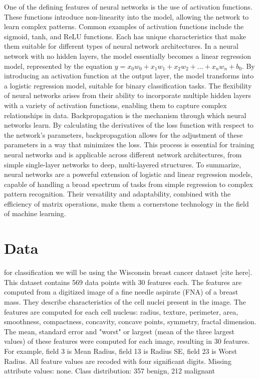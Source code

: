 \documentclass[twoside,11pt]{report}
\begin{document}
    One of the defining features of neural networks is the use of activation functions. These functions introduce 
    non-linearity into the model, allowing the network to learn complex patterns. Common examples of activation 
    functions include the sigmoid, tanh, and ReLU functions. Each has unique characteristics that make them suitable 
    for different types of neural network architectures.
    In a neural network with no hidden layers, the model essentially becomes a linear regression model, represented by 
    the equation $y = x_0w_0 + x_1w_1 + x_2w_2 + ... + x_nw_n + b_0$. By introducing an activation function at the 
    output layer, the model transforms into a logistic regression model, suitable for binary classification tasks. 
    The flexibility of neural networks arises from their ability to incorporate multiple hidden layers with a variety 
    of activation functions, enabling them to capture complex relationships in data.
    Backpropagation is the mechanism through which neural networks learn. By calculating the derivatives of the loss 
    function with respect to the network's parameters, backpropagation allows for the adjustment of these parameters 
    in a way that minimizes the loss. This process is essential for training neural networks and is applicable across 
    different network architectures, from simple single-layer networks to deep, multi-layered structures.
    To summarize, neural networks are a powerful extension of logistic and linear regression models, capable of 
    handling a broad spectrum of tasks from simple regression to complex pattern recognition. Their versatility and 
    adaptability, combined with the efficiency of matrix operations, make them a cornerstone technology in the field 
    of machine learning.


\section{Data}
\label{sec:data}

    for classification we will be using the Wisconsin breast cancer dataset [cite here]. This dataset contains 
    569 data points with 30 features each. The features are computed from a digitized image of a fine needle aspirate
    (FNA) of a breast mass. They describe characteristics of the cell nuclei present in the image. The features are 
    computed for each cell nucleus: radius, texture, perimeter, area, smoothness, compactness, concavity, 
    concave points, symmetry, fractal dimension. The mean, standard error and "worst" or largest 
    (mean of the three largest values) of these features were computed for each image, resulting in 30 features. 
    For example, field 3 is Mean Radius, field 13 is Radius SE, field 23 is Worst Radius.
    All feature values are recoded with four significant digits. Missing attribute values: none.
    Class distribution: 357 benign, 212 malignant
\end{document}
